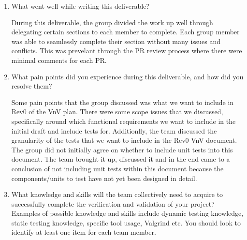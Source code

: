 \documentclass[12pt, titlepage]{article}
\begin{document}
\begin{enumerate}
  \item What went well while writing this deliverable? 

During this deliverable, the group divided the work up well through delegating
certain sections to each member to complete. Each group member was able to
seamlessly complete their section without many issues and conflicts. This was
prevelant through the PR review process where there were minimal comments for
each PR.

  \item What pain points did you experience during this deliverable, and how
    did you resolve them?

Some pain points that the group discussed was what we want to include in Rev0 of
the VnV plan. There were some scope issues that we discussed, specifically
around which functional requirements we want to include in the initial draft and
include tests for. Additionlly, the team discussed the granularity of the tests
that we want to include in the Rev0 VnV document. The group did not initially
agree on whether to include unit tests into this document. The team brought it
up, discussed it and in the end came to a conclusion of not including unit tests
within this document because the components/units to test have not yet been
designed in detail.

  \item What knowledge and skills will the team collectively need to acquire to
  successfully complete the verification and validation of your project?
  Examples of possible knowledge and skills include dynamic testing knowledge,
  static testing knowledge, specific tool usage, Valgrind etc.  You should look to
  identify at least one item for each team member.


\end{enumerate}
\end{document}
